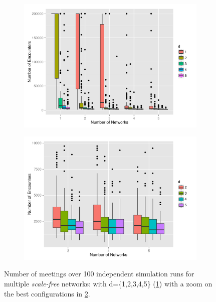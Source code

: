 \documentclass[preprint,number]{elsarticle}
\begin{document}
\begin{figure}[H]
	\centering
	\begin{subfigure}{.49\linewidth}
		\centering
		\includegraphics[width=1\linewidth]{"../analysis/pdf/context_permeability_encounters_sf"}
		\caption{}
		\label{fig:ctx_perm_sf_full}
	\end{subfigure}%
	\begin{subfigure}{.49\linewidth}
		\centering
		\includegraphics[width=1\linewidth]{"../analysis/pdf/context_permeability_encounters_sf_best"}
		\caption{}
		\label{fig:ctx_perm_sf_best}
	\end{subfigure}
	\begin{minipage}{0.9\linewidth}
		\vspace{0.2cm}
		\caption{Number of meetings over 100 independent simulation runs for multiple \textit{scale-free} networks: with d=\{1,2,3,4,5\} (\ref{fig:ctx_perm_sf_full}) with a zoom on the best configurations in \ref{fig:ctx_perm_sf_best}.}
		\label{fig:ctx_perm_sf}
	\end{minipage}
\end{figure}
\end{document}
